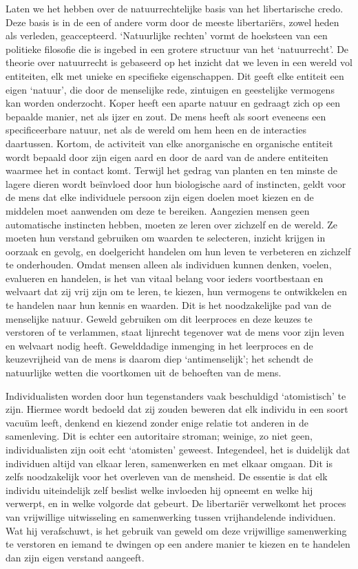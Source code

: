 \documentclass[
  a5paper,
  smalldemyvopaper,10pt,twoside,onecolumn,openright,extrafontsizes,hidelinks]{memoir}
\begin{document}
Laten we het hebben over de natuurrechtelijke basis van het
libertarische credo. Deze basis is in de een of andere vorm door de
meeste libertariërs, zowel heden als verleden, geaccepteerd.
`Natuurlijke rechten' vormt de hoeksteen van een politieke filosofie die
is ingebed in een grotere structuur van het `natuurrecht'. De theorie
over natuurrecht is gebaseerd op het inzicht dat we leven in een wereld
vol entiteiten, elk met unieke en specifieke eigenschappen. Dit geeft
elke entiteit een eigen `natuur', die door de menselijke rede, zintuigen
en geestelijke vermogens kan worden onderzocht. Koper heeft een aparte
natuur en gedraagt zich op een bepaalde manier, net als ijzer en zout.
De mens heeft als soort eveneens een specificeerbare natuur, net als de
wereld om hem heen en de interacties daartussen. Kortom, de activiteit
van elke anorganische en organische entiteit wordt bepaald door zijn
eigen aard en door de aard van de andere entiteiten waarmee het in
contact komt. Terwijl het gedrag van planten en ten minste de lagere
dieren wordt beïnvloed door hun biologische aard of instincten, geldt
voor de mens dat elke individuele persoon zijn eigen doelen moet kiezen
en de middelen moet aanwenden om deze te bereiken. Aangezien mensen geen
automatische instincten hebben, moeten ze leren over zichzelf en de
wereld. Ze moeten hun verstand gebruiken om waarden te selecteren,
inzicht krijgen in oorzaak en gevolg, en doelgericht handelen om hun
leven te verbeteren en zichzelf te onderhouden. Omdat mensen alleen als
individuen kunnen denken, voelen, evalueren en handelen, is het van
vitaal belang voor ieders voortbestaan en welvaart dat zij vrij zijn om
te leren, te kiezen, hun vermogens te ontwikkelen en te handelen naar
hun kennis en waarden. Dit is het noodzakelijke pad van de menselijke
natuur. Geweld gebruiken om dit leerproces en deze keuzes te verstoren
of te verlammen, staat lijnrecht tegenover wat de mens voor zijn leven
en welvaart nodig heeft. Gewelddadige inmenging in het leerproces en de
keuzevrijheid van de mens is daarom diep `antimenselijk'; het schendt de
natuurlijke wetten die voortkomen uit de behoeften van de mens.

Individualisten worden door hun tegenstanders vaak beschuldigd
`atomistisch' te zijn. Hiermee wordt bedoeld dat zij zouden beweren dat
elk individu in een soort vacuüm leeft, denkend en kiezend zonder enige
relatie tot anderen in de samenleving. Dit is echter een autoritaire
stroman; weinige, zo niet geen, individualisten zijn ooit echt
`atomisten' geweest. Integendeel, het is duidelijk dat individuen altijd
van elkaar leren, samenwerken en met elkaar omgaan. Dit is zelfs
noodzakelijk voor het overleven van de mensheid. De essentie is dat elk
individu uiteindelijk zelf beslist welke invloeden hij opneemt en welke
hij verwerpt, en in welke volgorde dat gebeurt. De libertariër
verwelkomt het proces van vrijwillige uitwisseling en samenwerking
tussen vrijhandelende individuen. Wat hij verafschuwt, is het gebruik
van geweld om deze vrijwillige samenwerking te verstoren en iemand te
dwingen op een andere manier te kiezen en te handelen dan zijn eigen
verstand aangeeft.
\end{document}
